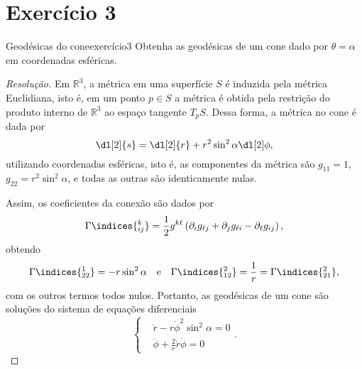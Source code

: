 \section*{Exercício 3}
\begin{exercício}{Geodésicas do cone}{exercício3}
    Obtenha as geodésicas de um cone dado por \(\theta = \alpha\) em coordenadas esféricas.
\end{exercício}
\begin{proof}[Resolução]
    Em \(\mathbb{R}^3\), a métrica em uma superfície \(S\) é induzida pela métrica Euclidiana, isto é, em um ponto \(p\in S\) a métrica é obtida pela restrição do produto interno de \(\mathbb{R}^3\) ao espaço tangente \(T_pS\). Dessa forma, a métrica no cone é dada por
    \begin{equation*}
        \dl[2]{s} = \dl[2]{r} + r^2\sin^2\alpha\dl[2]\phi,
    \end{equation*}
    utilizando coordenadas esféricas, isto é, as componentes da métrica são \(g_{11} = 1\), \(g_{22} = r^2\sin^2\alpha\), e todas as outras são identicamente nulas.

    Assim, os coeficientes da conexão são dados por
    \begin{equation*}
        \Gamma\indices{^k_{ij}} = \frac12 g^{k\ell}\left(\partial_i g_{\ell j} + \partial_j g_{\ell i} - \partial_\ell g_{ij}\right),
    \end{equation*}
    obtendo
    \begin{equation*}
        \Gamma\indices{^1_{22}} = - r\sin^2\alpha\quad\text{e}\quad \Gamma\indices{^2_{12}} = \frac1r = \Gamma\indices{^2_{21}},
    \end{equation*}
    com os outros termos todos nulos. Portanto, as geodésicas de um cone são soluções do sistema de equações diferenciais
    \begin{equation*}
        \left\{\begin{aligned}
                &\ddot{r} - r\dot{\phi}^2\sin^2\alpha = 0\\
                &\ddot{\phi} + \frac2r \dot{r}\dot{\phi} =0
        \end{aligned}\right..
    \end{equation*}
\end{proof}
